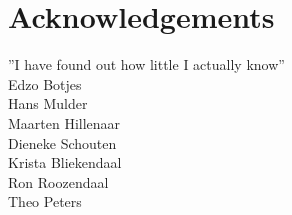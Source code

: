 {}
\chapter*{Acknowledgements}
\bigskip

''I have found out how little I actually know''\\

\noindent Edzo Botjes\\
Hans Mulder\\
Maarten Hillenaar\\
Dieneke Schouten\\
Krista Bliekendaal\\
Ron Roozendaal\\
Theo Peters\\
